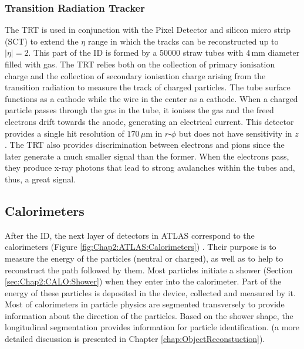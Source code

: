 \subsubsection{Transition Radiation Tracker}
\label{sec:Chap2:ID:TRT}
The TRT is used in conjunction with the Pixel Detector and silicon micro strip (SCT) to extend 
the $\eta$ range in which the tracks can be reconstructed up to $|\eta| = 2$. This part of the ID 
is formed by a 50000 straw tubes with  $4\,$mm diameter filled with gas.
 The TRT relies both on the collection of primary ionisation charge and the collection of secondary ionisation charge arising 
 from the transition radiation to measure the  track of charged particles. 
 The tube surface functions as a cathode while the wire in the center as a cathode. When a charged particle passes through the gas in 
 the tube, it ionises the gas and the freed electrons drift towards the anode, generating an electrical current. This detector provides 
 a single hit resolution of $170\,\mu$m in $r$-$\phi$ but does not have sensitivity in $z$.
The TRT also provides discrimination between electrons and pions since the later generate a much smaller signal than the former. When the electrons pass, they produce
x-ray photons that lead to strong avalanches within the tubes and, thus, a great signal.

\subsection{Calorimeters}
\label{sec:Chap2:CALO}
After the ID, the next layer of detectors in ATLAS correspond to the calorimeters (Figure \ref{fig:Chap2:ATLAS:Calorimeters}) \cite{Cavallari_2011}. 
Their purpose is to measure the energy of the particles 
(neutral or charged), as well as to help to reconstruct the path followed by them. 
Most particles initiate a shower (Section \ref{sec:Chap2:CALO:Shower}) when they enter into the calorimeter. Part of the energy 
of these particles is deposited in the device, collected and measured by it.
Most of calorimeters in particle physics are segmented transversely to provide information about the direction of the particles.
Based on the shower shape, the longitudinal segmentation provides information for particle identification.
(a more detailed discussion is presented in Chapter \ref{chap:ObjectReconstuction}). 

